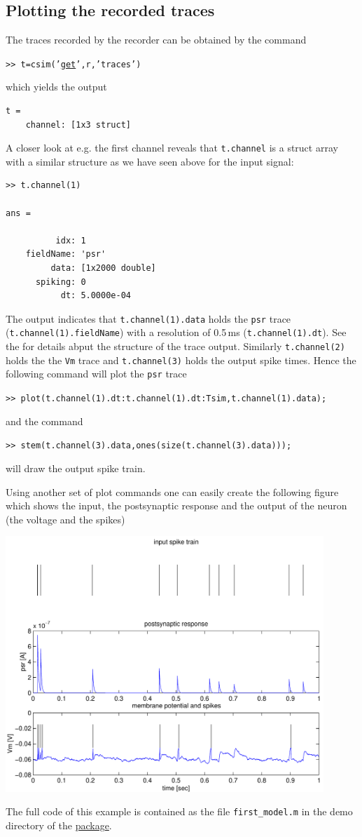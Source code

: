\subsection{Plotting the recorded traces} The traces recorded by the
recorder can be obtained by the command
\begin{tabbing}
\quad\tt>> t=csim('\hyperlink{cmd:get}{get}',r,'traces')
\end{tabbing}
which yields the output
\begin{verbatim}
t = 
    channel: [1x3 struct]
\end{verbatim}
A closer look at e.g. the first channel reveals that
\texttt{t.channel} is a struct array with a similar structure as we
have seen above for the input signal:
\begin{verbatim}
>> t.channel(1)           

ans = 

          idx: 1
    fieldName: 'psr'
         data: [1x2000 double]
      spiking: 0
           dt: 5.0000e-04
\end{verbatim}

The output indicates that \texttt{t.channel(1).data} holds the
\texttt{psr} trace (\texttt{t.channel(1).fieldName}) with a resolution
of 0.5\,ms (\texttt{t.channel(1).dt}). See the
 for details abput
the structure of the trace output. Similarly \texttt{t.channel(2)}
holds the the \texttt{Vm} trace and \texttt{t.channel(3)} holds the
output spike times. Hence the following command will plot
the \texttt{psr} trace
\begin{tabbing}
\quad\tt>> plot(t.channel(1).dt:t.channel(1).dt:Tsim,t.channel(1).data);
\end{tabbing}
and the command
\begin{tabbing}
\quad\tt>> stem(t.channel(3).data,ones(size(t.channel(3).data)));
\end{tabbing}
will draw the output spike train.

Using another set of plot commands one can easily create the following
figure which shows the input, the postsynaptic response and the output
of the neuron (the voltage and the spikes)

\begin{center}
\includegraphics[width=12cm]{first-model-output}
\end{center}

The full code of this example is contained as the file
\texttt{first\_model.m} in the demo directory of the
\href{http://www.lsm.tugraz.at/csim}{\csim package}.


